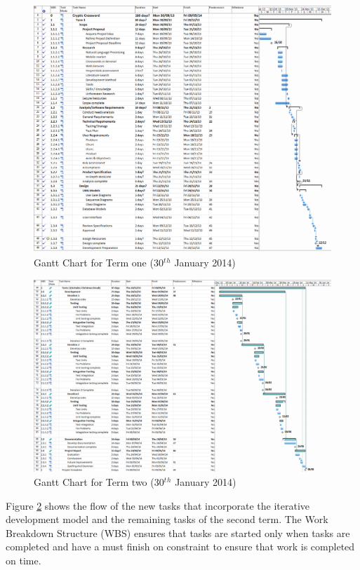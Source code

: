 \begin{landscape}
\begin{figure}[H]
  \centering
  \includegraphics[scale=0.35]{images/gant_chart_interim_term1.png}
  \caption{Gantt Chart for Term one (30$^t$$^h$ January 2014)}
  \label{fig:ganttinterimterm1}
\end{figure}

\begin{figure}[H]
  \centering
  \includegraphics[width=\linewidth]{images/gant_chart_interim_term2.png}
  \caption{Gantt Chart for Term two (30$^t$$^h$ January 2014)}
  \label{fig:ganttinterimterm2}
\end{figure}

Figure \ref{fig:ganttinterimterm2} shows the flow of the new tasks that
incorporate the iterative development model and the remaining tasks of the
second term. The Work Breakdown Structure (WBS) ensures that tasks are started
only when tasks are completed and have a must finish on constraint to ensure
that work is completed on time.


\end{landscape}

